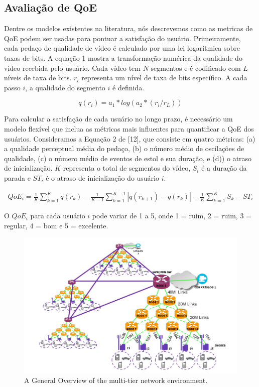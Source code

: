 \subsection{Avaliação de QoE}

Dentre os modelos existentes na literatura, nós descrevemos como as metricas de QoE podem ser usadas para pontuar a satisfação do usuário. Primeiramente, cada pedaço de qualidade de vídeo é calculado por uma lei logarítmica sobre taxas de bits. A equação 1 mostra a transformação numérica da qualidade do video recebida pelo usuário. Cada vídeo tem $N$ segmentos e é codificado com $L$ níveis de taxa de bits. $r_i$ representa um nível de taxa de bits específico. A cada passo $i$, a qualidade do segmento $i$ é definida.

\begin{equation}\label{eq:equation-1}
q(r_i) = a_1 * log(a_2 * (r_i/ r_{L}))
\end{equation}
\vspace{0.1cm}

Para calcular a satisfação de cada usuário no longo prazo, é necessário um modelo flexível que inclua as métricas mais influentes para quantificar a QoE dos usuários. Consideramos a Equação 2 de [12], que consiste em quatro métricas: (a) a qualidade perceptual média do pedaço, (b) o número médio de oscilações de qualidade, (c) o número médio de eventos de estol e sua duração, e (d)) o atraso de inicialização. $K$ representa o total de segmentos do vídeo, $S_i$ é a duração da parada e $ST_i$ é o atraso de inicialização do usuário $i$.

\begin{equation}\label{eq:qoe-equation}
\begin{split}
QoE_i = \frac{1}{K} \sum_{k=1}^{K}q(r_{k}) - \frac{1}{K-1} \sum_{k=1}^{K-1}|q(r_{k+1}) - q(r_{k})| - \frac{1}{K}\sum_{k=1}^{K} S_{k} - ST_{i}
\end{split}
\end{equation}
\vspace{0.1cm}

O $QoE_{i}$ para cada usuário $i$ pode variar de 1 a 5, onde 1 = ruim, 2 = ruim, 3 = regular, 4 = bom e 5 = excelente.

\begin{figure}[htb!]
    \centering
    \includegraphics[width=\linewidth]{images/scenario.png}
    \caption{A General Overview of the multi-tier network environment.}
    \label{fig:multi-tier-network}
\end{figure}

